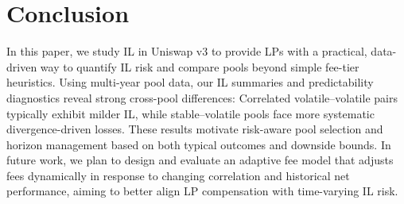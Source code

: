 \documentclass[journal]{IEEEtran}
\begin{document}
\section{Conclusion}
\label{sec:conclusion}
In this paper, we study IL in Uniswap v3 to provide LPs with a practical, data-driven way to quantify IL risk and compare pools beyond simple fee-tier heuristics. 
Using multi-year pool data, our IL summaries and predictability diagnostics reveal strong cross-pool differences: Correlated volatile--volatile pairs typically exhibit milder IL, while stable--volatile pools face more systematic divergence-driven losses. These results motivate risk-aware pool selection and horizon management based on both typical outcomes and downside bounds.
In future work, we plan to design and evaluate an adaptive fee model that adjusts fees dynamically in response to changing correlation and historical net performance, aiming to better align LP compensation with time-varying IL risk.



\end{document}
